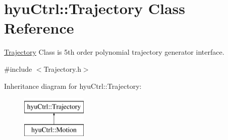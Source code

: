 \hypertarget{classhyu_ctrl_1_1_trajectory}{}\section{hyu\+Ctrl\+:\+:Trajectory Class Reference}
\label{classhyu_ctrl_1_1_trajectory}


\hyperlink{classhyu_ctrl_1_1_trajectory}{Trajectory} Class is 5th order polynomial trajectory generator interface.  




{\ttfamily \#include $<$Trajectory.\+h$>$}

Inheritance diagram for hyu\+Ctrl\+:\+:Trajectory\+:\begin{figure}[H]
\begin{center}
\leavevmode
\includegraphics[height=2.000000cm]{classhyu_ctrl_1_1_trajectory}
\end{center}
\end{figure}
